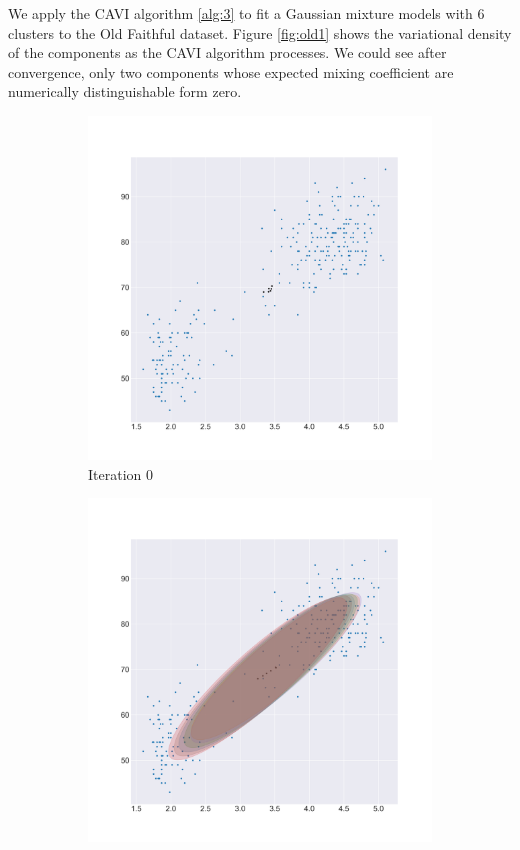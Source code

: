 \documentclass[letterpaper]{article}
\begin{document}
We apply the CAVI algorithm \ref{alg:3} to fit a Gaussian mixture models with 6 clusters to the Old Faithful dataset. Figure \ref{fig:old1} shows the variational density of the components as the CAVI algorithm processes. We could see after convergence, only two components whose expected mixing coefficient are numerically distinguishable form zero.

\begin{figure}[H]
  \centering
  \begin{subfigure}[b]{0.25\linewidth}
    \includegraphics[width=\linewidth]{outputs/old_faithful/iter_0.png}
     \caption{Iteration 0}
  \end{subfigure}
  \begin{subfigure}[b]{0.25\linewidth}
    \includegraphics[width=\linewidth]{outputs/old_faithful/iter_10.png}

\end{subfigure}
\end{figure}
\end{document}
